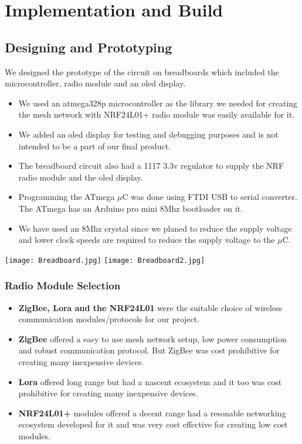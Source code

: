 \chapter{Implementation and Build}

\section{Designing and Prototyping}
We designed the prototype of the circuit on breadboards which included the microcontroller, radio module and an oled display.

\begin{itemize}
	\item We used an atmega328p microcontroller as the library we needed for creating the mesh network with NRF24L01+ radio module was easily available for it.
	
	\item We added an oled display for testing and debugging purposes and is not intended to be a part of our final product.

	\item The breadboard circuit also had a 1117 3.3v regulator to supply the NRF radio module and the oled display.
	
	\item Programming the ATmega $\mu$C was done using FTDI USB to serial converter. The ATmega has an Arduino pro mini 8Mhz bootloader on it.
	
	\item We have used an 8Mhz crystal since we planed to reduce the supply voltage and lower clock speeds are required to reduce the supply voltage to the $\mu$C.
	
\end{itemize}	

\vspace{20pt}

\texttt{[image: Breadboard.jpg]}
\texttt{[image: Breadboard2.jpg]}

\pagebreak

\subsection{Radio Module Selection}

\begin{itemize}
	\item \textbf{ZigBee, Lora and the NRF24L01} were the suitable choice of wireless communication modules/protocols for our project. 
	\item \textbf{ZigBee} offered a easy to use mesh network setup, low power consumption and robust communication protocol. But ZigBee was cost prohibitive for creating many inexpensive devices. 
	\item \textbf{Lora} offered long range but had a nascent ecosystem and it too was cost prohibitive for creating many inexpensive devices.
	\item \textbf{NRF24L01+} modules offered a decent range had a resonable networking ecosystem developed for it and was very cost effective for creating low cost modules.
\end{itemize}	

